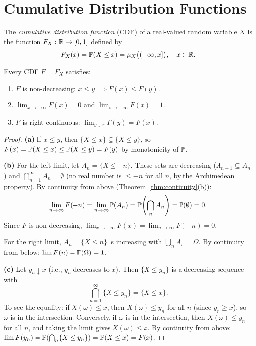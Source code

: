 \documentclass[11pt,a4paper]{article}
\begin{document}

\section{Cumulative Distribution Functions}
\label{sec:cdf}

\begin{definition}
\label{def:cdf}
The \emph{cumulative distribution function} (CDF) of a real-valued random
variable $X$ is the function $F_X: \mathbb{R} \to [0, 1]$ defined by
\begin{equation}
  F_X(x) = \mathbb{P}(X \leq x) = \mu_X\bigl((-\infty, x]\bigr),
  \quad x \in \mathbb{R}.
  \label{eq:cdf}
\end{equation}
\end{definition}

\begin{proposition}
\label{prop:cdf_props}
Every CDF $F = F_X$ satisfies:
\begin{enumerate}[nosep,label=(\alph*)]
  \item $F$ is non-decreasing: $x \leq y \implies F(x) \leq F(y)$.
  \item $\lim_{x \to -\infty} F(x) = 0$ and
    $\lim_{x \to +\infty} F(x) = 1$.
  \item $F$ is right-continuous: $\lim_{y \downarrow x} F(y) = F(x)$.
\end{enumerate}
\end{proposition}

\begin{proof}
\textbf{(a)} If $x \leq y$, then $\{X \leq x\} \subseteq \{X \leq y\}$,
so $F(x) = \mathbb{P}(X \leq x) \leq \mathbb{P}(X \leq y) = F(y)$ by monotonicity
of $\mathbb{P}$.

\textbf{(b)} For the left limit, let $A_n = \{X \leq -n\}$. These sets
are decreasing ($A_{n+1} \subseteq A_n$) and
$\bigcap_{n=1}^\infty A_n = \emptyset$ (no real number is $\leq -n$ for all
$n$, by the Archimedean property). By continuity from above
(Theorem~\ref{thm:continuity}(b)):
\[
  \lim_{n \to \infty} F(-n) = \lim_{n \to \infty} \mathbb{P}(A_n)
  = \mathbb{P}\!\left(\bigcap_n A_n\right) = \mathbb{P}(\emptyset) = 0.
\]
Since $F$ is non-decreasing, $\lim_{x \to -\infty} F(x)
= \lim_{n \to \infty} F(-n) = 0$.

For the right limit, $A_n = \{X \leq n\}$ is increasing with
$\bigcup_n A_n = \Omega$. By continuity from below:
$\lim F(n) = \mathbb{P}(\Omega) = 1$.

\textbf{(c)} Let $y_n \downarrow x$ (i.e., $y_n$ decreases to $x$). Then
$\{X \leq y_n\}$ is a decreasing sequence with
\[
  \bigcap_{n=1}^\infty \{X \leq y_n\} = \{X \leq x\}.
\]
To see the equality: if $X(\omega) \leq x$, then $X(\omega) \leq y_n$ for
all $n$ (since $y_n \geq x$), so $\omega$ is in the intersection.
Conversely, if $\omega$ is in the intersection, then $X(\omega) \leq y_n$
for all $n$, and taking the limit gives $X(\omega) \leq x$.
By continuity from above:
$\lim F(y_n) = \mathbb{P}(\bigcap_n \{X \leq y_n\}) = \mathbb{P}(X \leq x) = F(x)$.
\end{proof}
\end{document}
